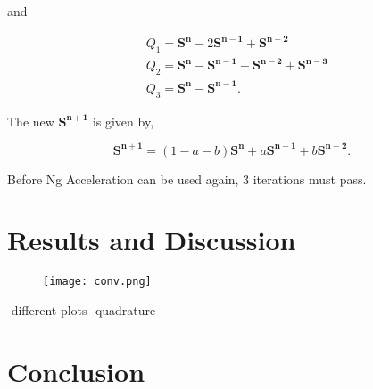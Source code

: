 \documentclass[12pt]{article}
\begin{document}
and 

\begin{equation}
    \begin{split}
        & Q_{1} = \mathbf{S^{n}}-2\mathbf{S^{n-1}}+\mathbf{S^{n-2}}\\
        & Q_{2} = \mathbf{S^{n}}-\mathbf{S^{n-1}}-\mathbf{S^{n-2}}+\mathbf{S^{n-3}}\\
        & Q_{3} = \mathbf{S^{n}}-\mathbf{S^{n-1}}.
    \end{split}
\end{equation}

The new $\mathbf{S^{n+1}}$ is given by,

\begin{equation}
    \mathbf{S^{n+1}} = (1-a-b)\mathbf{S^{n}} + a\mathbf{S^{n-1}} + b\mathbf{S^{n-2}}.
\end{equation}

Before Ng Acceleration can be used again, 3 iterations must pass.


\section{Results and Discussion}

\begin{figure}[ht]
 \centering
 \texttt{[image: conv.png]}
 \caption{}
\end{figure}

-different plots
-quadrature

\section{Conclusion}




\end{document}
